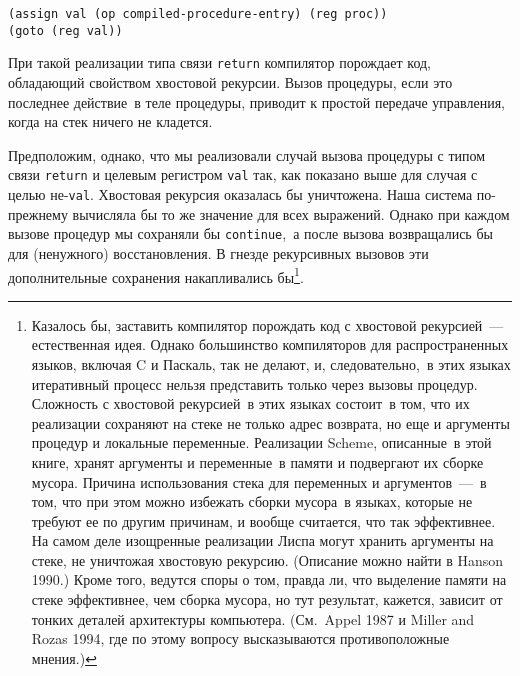\begin{Verbatim}[fontsize=\small]
(assign val (op compiled-procedure-entry) (reg proc))
(goto (reg val))
\end{Verbatim}

При такой реализации типа связи {\tt return} компилятор
порождает код, обладающий свойством хвостовой рекурсии.  Вызов
процедуры, если это последнее действие~в теле процедуры, приводит к
простой передаче управления, когда на стек ничего не кладется.

Предположим, однако, что мы реализовали случай вызова
процедуры с типом связи {\tt return} и целевым регистром
{\tt val} так,  как показано выше для случая с целью
не-{\tt val}.  Хвостовая рекурсия оказалась бы уничтожена.
Наша система по-прежнему вычисляла бы то же значение для всех
выражений.  Однако при каждом вызове процедур мы сохраняли бы
{\tt continue},~а после вызова возвращались бы для (ненужного)
восстановления.   В гнезде рекурсивных вызовов эти дополнительные
сохранения накапливались бы\footnote{Казалось бы, заставить  компилятор порождать код с
хвостовой рекурсией~--- естественная идея.  Однако большинство
компиляторов для распространенных языков, включая C и Паскаль, так не
делают, и, следовательно,~в этих языках итеративный процесс нельзя
представить только через вызовы процедур.   
%
Сложность с хвостовой 
рекурсией~в этих языках состоит~в том, что их реализации сохраняют на
стеке не только адрес возврата, но еще и аргументы процедур и
локальные переменные.  Реализации Scheme, описанные~в этой книге,
хранят аргументы и переменные~в памяти и подвергают их сборке мусора.
Причина использования стека для переменных и аргументов~---~в том,
что при этом можно избежать сборки мусора~в языках, которые не требуют
ее по другим причинам, и вообще считается, что так эффективнее.
На самом деле изощренные реализации Лиспа могут хранить аргументы на
стеке, не уничтожая хвостовую рекурсию.  (Описание можно найти в
Hanson 1990.)
Кроме того, ведутся споры о том,
правда ли, что выделение памяти на стеке эффективнее, чем сборка
мусора, но тут результат, кажется, зависит от тонких деталей
архитектуры компьютера. (См.~Appel 1987 и 
Miller and Rozas 1994,
где по этому вопросу высказываются противоположные мнения.)
}.

